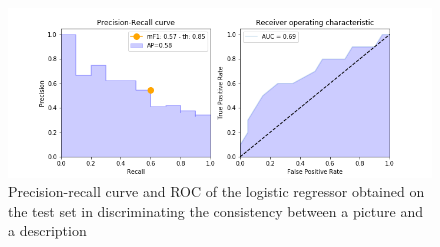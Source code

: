 \documentclass{article} %
\begin{document}
\begin{figure}[htbp]
	\centering
	\includegraphics[width=\textwidth]{../results/ROC_idf*norm-simi2}
	\caption{Precision-recall curve and ROC of the logistic regressor obtained on the test set in discriminating the consistency between a picture and a description}
	\label{fig: consistent-metric}
\end{figure}
\end{document}
